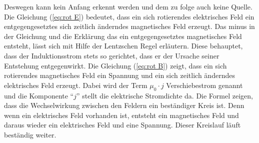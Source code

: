 Deswegen kann kein Anfang erkennt werden und dem zu folge auch keine Quelle.
Die Gleichung (\ref{eq:rot E}) bedeutet, dass ein sich rotierendes elektrisches Feld ein entgegengesetztes sich zeitlich änderndes magnetisches Feld erzeugt.
Das minus in der Gleichung und die Erklärung das ein entgegengesetztes magnetisches Feld entsteht, lässt sich mit Hilfe der Lentzschen Regel erläutern.
Diese behauptet, dass der Induktionsstrom stets so gerichtet, dass er der Ursache seiner Entstehung entgegenwirkt.
Die Gleichung (\ref{eq:rot B}) zeigt, dass ein sich rotierendes magnetisches Feld ein Spannung und ein sich zeitlich änderndes elektrisches Feld erzeugt.
Dabei wird der Term $\mu_0 \cdot j$ Verschiebestrom genannt und die Komponente "`$j$"' stellt die elektrische Stromdichte da.
Die Formel zeigen, dass die Wechselwirkung zwischen den Feldern ein beständiger Kreis ist. 
Denn wenn ein elektrisches Feld vorhanden ist, entsteht ein magnetisches Feld und daraus wieder ein elektrisches Feld und eine Spannung.
Dieser Kreislauf läuft beständig weiter.